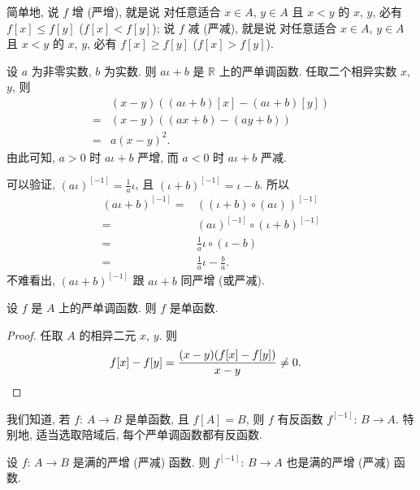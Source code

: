 简单地, 说 $f$ 增 (严增), 就是说%
对任意适合 $x \in A$, $y \in A$ 且 $x < y$ 的 $x$, $y$,
必有 $f[x] \leq f[y]$ ($f[x] < f[y]$);
说 $f$ 减 (严减), 就是说%
对任意适合 $x \in A$, $y \in A$ 且 $x < y$ 的 $x$, $y$,
必有 $f[x] \geq f[y]$ ($f[x] > f[y]$).

\begin{example}
    设 $a$ 为非零实数, $b$ 为实数.
    则 $a\iota + b$ 是 $\mathbb{R}$ 上的严单调函数.
    任取二个相异实数 $x$, $y$, 则
    \begin{align*}
             & (x - y)((a\iota + b)[x] - (a\iota + b)[y]) \\
        = {} & (x - y)((ax + b) - (ay + b))               \\
        = {} & a(x - y)^2.
    \end{align*}
    由此可知,
    $a > 0$ 时 $a\iota + b$ 严增,
    而 $a < 0$ 时 $a\iota + b$ 严减.

    可以验证,
    $(a\iota)^{[-1]} = \frac{1}{a} \iota$,
    且 $(\iota + b)^{[-1]} = \iota - b$.
    所以
    \begin{align*}
        (a\iota + b)^{[-1]}
        = {} & ((\iota + b) \circ (a\iota))^{[-1]}      \\
        = {} & (a\iota)^{[-1]} \circ (\iota + b)^{[-1]} \\
        = {} & \frac{1}{a} \iota \circ (\iota - b)      \\
        = {} & \frac{1}{a} \iota - \frac{b}{a}.
    \end{align*}
    不难看出,
    $(a\iota + b)^{[-1]}$ 跟 $a\iota + b$ 同严增 (或严减).
\end{example}

\begin{theorem}
    设 $f$ 是 $A$ 上的严单调函数.
    则 $f$ 是单函数.
\end{theorem}

\begin{proof}
    任取 $A$ 的相异二元 $x$, $y$.
    则
    \begin{align*}
         & f[x] - f[y] = \frac{(x - y)(f[x] - f[y])}{x - y} \neq 0. \qedhere
    \end{align*}
\end{proof}

我们知道, 若 $f$: $A \to B$ 是单函数, 且 $f[A] = B$,
则 $f$ 有反函数 $f^{[-1]}$: $B \to A$.
特别地, 适当选取陪域后, 每个严单调函数都有反函数.

\begin{theorem}
    设 $f$: $A \to B$ 是满的严增 (严减) 函数.
    则 $f^{[-1]}$: $B \to A$ 也是满的严增 (严减) 函数.
\end{theorem}

